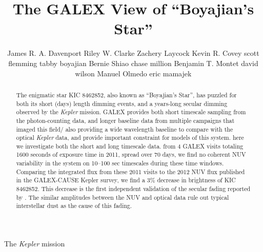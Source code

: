 \documentclass[manuscript, letterpaper]{aastex6}
\makeatletter
\let\origsection\section
\renewcommand\section{\@ifstar{\starsection}{\nostarsection}}
\newcommand\nostarsection[1]{\sectionprelude\origsection{#1}}
\newcommand\starsection[1]{\sectionprelude\origsection*{#1}}
\newcommand\sectionprelude{\vspace{1em}}
\newcommand{\Kepler}{\textsl{Kepler}\xspace}
\makeatother
\begin{document}
\title{The GALEX View of ``Boyajian's Star''}


\author{
	James R. A. Davenport
	Riley W. Clarke
	Zachery Laycock
	Kevin R. Covey
	scott flemming
	tabby boyajian
	Bernie Shiao
	chase million
	Benjamin T. Montet
	david wilson
	Manuel Olmedo
	eric mamajek
	}

 

 

\begin{abstract}
The enigmatic star KIC 8462852, also known as ``Boyajian's Star'',  has puzzled for both its short (days) length dimming events, and a years-long secular dimming observed by the \Kepler mission.
GALEX provides both short timescale sampling from the photon-counting data, and longer baseline data from multiple campaigns that imaged this field/ also providing a wide wavelength baseline to compare with the optical \Kepler data, and provide important constraint for models of this system.
here we investigate both the short and long timescale data. from 4 GALEX visits totaling 1600 seconds of exposure time in 2011, spread over 70 days, we find no coherent NUV variability in the system on 10--100 sec timescales during these time windows. Comparing the integrated flux from these 2011 visits to the 2012 NUV flux published in the GALEX-CAUSE Kepler survey, we find a 3\% decrease in brightness of KIC 8462852. This decrease is the first independent validation of the secular fading reported by \citet{montet2016}. The similar amplitudes between the NUV and optical data rule out typical interstellar dust as the cause of this fading.
\end{abstract}



\section{Introduction}

The \Kepler mission \citep{borucki2010} 
\end{document}
